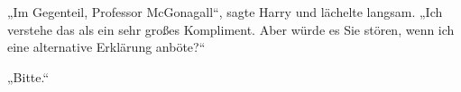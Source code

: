 „Im Gegenteil, Professor McGonagall“, sagte Harry und lächelte langsam. „Ich verstehe das als ein sehr großes Kompliment. Aber würde es Sie stören, wenn ich eine alternative Erklärung anböte?“

„Bitte.“

